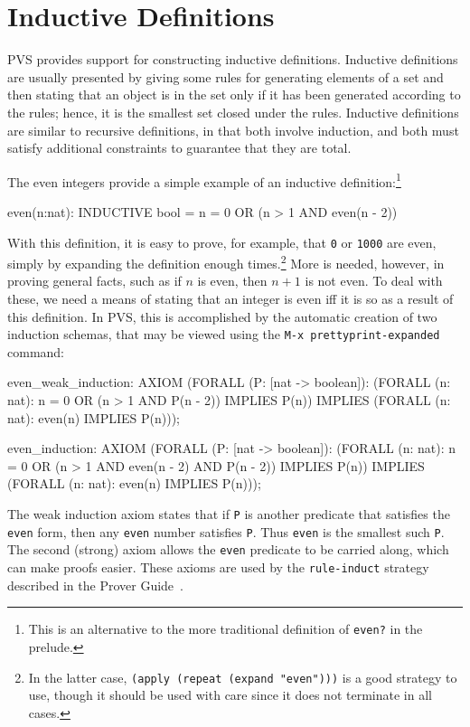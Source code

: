 \section{Inductive Definitions}
\label{inductive-definitions}

PVS provides support for constructing inductive definitions.  Inductive
definitions are usually presented by giving some rules for generating
elements of a set and then stating that an object is in the set only if it
has been generated according to the rules; hence, it is the smallest set
closed under the rules.  Inductive definitions are similar to recursive
definitions, in that both involve induction, and both must satisfy
additional constraints to guarantee that they are total.

The even integers provide a simple example of an inductive
definition:\footnote{This is an alternative to the more traditional
definition of \texttt{even?} in the prelude.}
\begin{pvsex}
  even(n:nat): INDUCTIVE bool =
    n = 0 OR (n > 1 AND even(n - 2))
\end{pvsex}
With this definition, it is easy to prove, for example, that \texttt{0} or
\texttt{1000} are even, simply by expanding the definition enough
times.\footnote{In the latter case, \texttt{(apply (repeat (expand
"even")))} is a good strategy to use, though it should be used with care
since it does not terminate in all cases.}  More is needed, however, in
proving general facts, such as if $n$ is even, then $n+1$ is not even.  To
deal with these, we need a means of stating that an integer is even iff it
is so as a result of this definition.  In PVS, this is accomplished by the
automatic creation of two induction schemas, that may be viewed using the
\texttt{M-x~prettyprint-expanded} command:
\begin{pvsex}
  even_weak_induction: AXIOM
        (FORALL (P: [nat -> boolean]):
           (FORALL (n: nat): n = 0 OR (n > 1 AND P(n - 2)) IMPLIES P(n))
               IMPLIES (FORALL (n: nat): even(n) IMPLIES P(n)));
  
  even_induction: AXIOM
        (FORALL (P: [nat -> boolean]):
           (FORALL (n: nat):
              n = 0 OR (n > 1 AND even(n - 2) AND P(n - 2)) IMPLIES P(n))
               IMPLIES (FORALL (n: nat): even(n) IMPLIES P(n)));
\end{pvsex}
The weak induction axiom states that if \texttt{P} is another predicate
that satisfies the \texttt{even} form, then any \texttt{even} number
satisfies \texttt{P}.  Thus \texttt{even} is the smallest such \texttt{P}.
The second (strong) axiom allows the \texttt{even} predicate to be carried
along, which can make proofs easier.  These axioms are used by the
\texttt{rule-induct} strategy described in the Prover
Guide~\cite{PVS:prover}.


